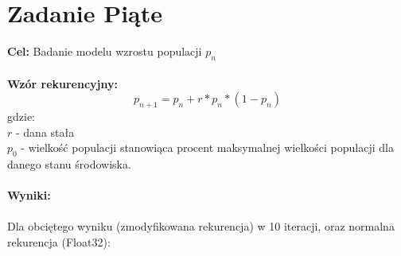\documentclass{article}
\begin{document}
\section*{Zadanie Piąte}
\noindent \textbf{Cel:} Badanie modelu wzrostu populacji $p_{n}$\\\\
\noindent \textbf{Wzór rekurencyjny:}
$$p_{n+1} = p_{n} + r*p_{n}*(1-p_{n})$$
gdzie: \\
$r$ - dana stała \\
$p_{0}$ - wielkość populacji stanowiąca procent maksymalnej wielkości populacji dla danego stanu środowiska.\\\\
\newpage
\noindent \textbf{Wyniki:} \\\\
Dla obciętego wyniku (zmodyfikowana rekurencja) w 10 iteracji, oraz normalna rekurencja (Float32):
\end{document}
